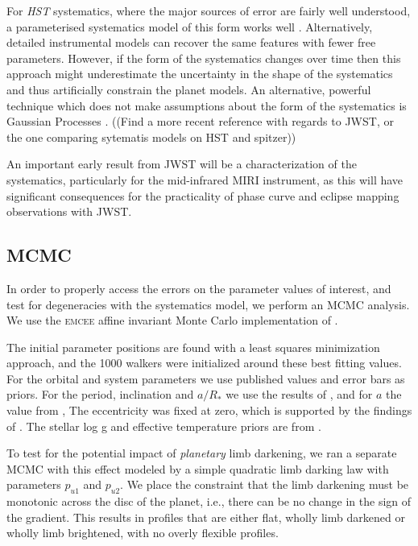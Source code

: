 \documentclass[a4paper,fleqn,usenatbib]{mnras}
\begin{document}
For \emph{HST} systematics, where the major sources of error are fairly well understood, a parameterised systematics model of this form works well \citet{Wakeford2016}. Alternatively, detailed instrumental models can recover the same features with fewer free parameters.  However, if the form of the systematics changes over time then this approach might underestimate the uncertainty in the shape of the systematics and thus artificially constrain the planet models. An alternative, powerful technique which does not make assumptions about the form of the systematics is Gaussian Processes \citep[e.g.][]{Gibson2012a}. ((Find a more recent reference with regards to JWST, or the one comparing sytematis models on HST and spitzer))

An important early result from JWST will be a characterization of the systematics, particularly for the mid-infrared MIRI instrument, as this will have significant consequences for the practicality of phase curve and eclipse mapping observations with JWST.

\subsection{MCMC}\label{sec:MCMC}

In order to properly access the errors on the parameter values of interest, and test for degeneracies with the systematics model, we perform an MCMC analysis. We use the \textsc{emcee} affine invariant Monte Carlo implementation of \citet{Foreman-Mackey2013}.

The initial parameter positions are found with a least squares minimization approach, and the 1000 walkers were initialized around these best fitting values. For the orbital and system parameters we use published values and error bars as priors. For the period, inclination and $a/R_*$ we use the results of \citet{Hoyer2016}, and for $a$ the value from \citet{Hellier2011a}, The eccentricity was fixed at zero, which is supported by the findings of \citet{Hoyer2016}. The stellar log g and effective temperature priors are from \citet{Gillon2012}.

To test for the potential impact of \emph{planetary} limb darkening, we ran a separate MCMC with this effect modeled by a simple quadratic limb darking law with parameters $p_{u1}$ and $p_{u2}$. We place the constraint that the limb darkening must be monotonic across the disc of the planet, i.e., there can be no change in the sign of the gradient. This results in profiles that are either flat, wholly limb darkened or wholly limb brightened, with no overly flexible profiles.
\end{document}
